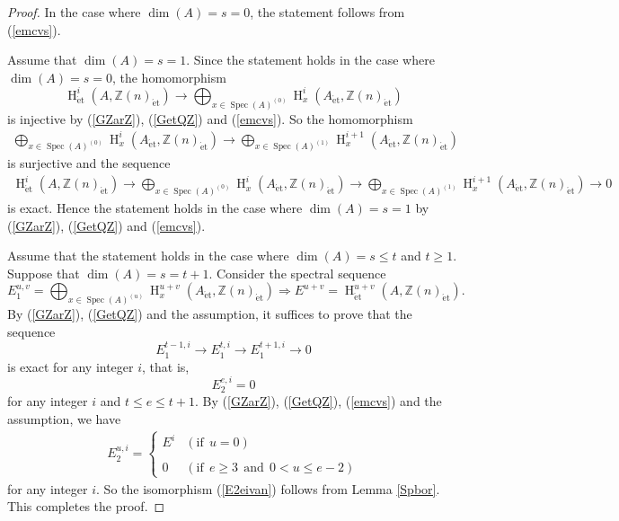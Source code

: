\documentclass{article}
\newcommand{\spec}{\operatorname{Spec}}
\newcommand{\et}{\mathrm{\acute{e}t}}
\newcommand{\HO}{\operatorname{H}}
\begin{document}
\begin{proof}
In the case where 
$\operatorname{dim}(A)=s=0$,
the statement follows from (\ref{emcvs}).

Assume that $\operatorname{dim}(A)=s=1$.
Since the statement holds in the case where
$\operatorname{dim}(A)=s=0$, 
the homomorphism
%
\begin{equation*}
\HO^{i}_{\et}(
A, \mathbb{Z}(n)_{\et}
)
\to
\displaystyle\bigoplus_{x\in \spec(A)^{(0)}}
\HO^{i}_{x}(
A_{\et},
\mathbb{Z}(n)_{\et}
)   
\end{equation*}
%
is injective by (\ref{GZarZ}), 
(\ref{GetQZ}) and (\ref{emcvs}).
So the homomorphism
%
\begin{align*}
\displaystyle\bigoplus_{x\in \spec(A)^{(0)}}
\HO^{i}_{x}(
A_{\et},
\mathbb{Z}(n)_{\et}
)
\to
\displaystyle\bigoplus_{x\in \spec(A)^{(1)}}
\HO^{i+1}_{x}(
A_{\et},
\mathbb{Z}(n)_{\et}
)
\end{align*}
%
is surjective and the sequence
%
\begin{align*}
\HO^{i}_{\et}(
A, \mathbb{Z}(n)_{\et}
)
\to
\displaystyle\bigoplus_{x\in \spec(A)^{(0)}}
\HO^{i}_{x}(
A_{\et},
\mathbb{Z}(n)_{\et}
)
\to
\displaystyle\bigoplus_{x\in \spec(A)^{(1)}}
\HO^{i+1}_{x}(
A_{\et},
\mathbb{Z}(n)_{\et}
)
\to 0
\end{align*}
%
is exact. 
Hence the statement holds in the case where 
$\operatorname{dim}(A)=s=1$
by (\ref{GZarZ}), 
(\ref{GetQZ}) and (\ref{emcvs}).

Assume that the statement holds in the case where 
$\operatorname{dim}(A)=s\leq t$ and $t\geq 1$. Suppose that 
$\operatorname{dim}(A)=s=t+1$. Consider the spectral sequence
%
\begin{equation*}
E_{1}^{u, v}
=\displaystyle\bigoplus_{x\in \spec(A)^{(u)}}
\HO_{x}^{u+v}(
A_{\et},
\mathbb{Z}(n)_{\et}
)
\Rightarrow
E^{u+v}
=\HO^{u+v}_{\et}(A, \mathbb{Z}(n)_{\et}).
\end{equation*}
%
By (\ref{GZarZ}), (\ref{GetQZ})
and the assumption,
it suffices to prove that the sequence
%
\begin{equation*}
E_{1}^{t-1, i}
\to 
E_{1}^{t, i}
\to 
E_{1}^{t+1, i}
\to 0
\end{equation*}
%
is exact for any integer $i$,
that is,
%
\begin{equation}\label{E2eivan}
E^{e, i}_{2}=0    
\end{equation}
%
for any integer $i$ and $t\leq e\leq t+1$.
By (\ref{GZarZ}), (\ref{GetQZ}), (\ref{emcvs})
and the assumption,
we have
%
\begin{align*}
E^{u, i}_{2}
=
%
\begin{cases}
E^{i}
& (\textrm{if}~~u=0) \\
\\
0
& (\textrm{if}~~e\geq 3~~\textrm{and}~~0<u\leq e-2)
\end{cases}
%
\end{align*}
%
for any integer $i$. So the isomorphism (\ref{E2eivan}) follows from Lemma \ref{Spbor}.
This completes the proof.
\end{proof}
%
\end{document}
